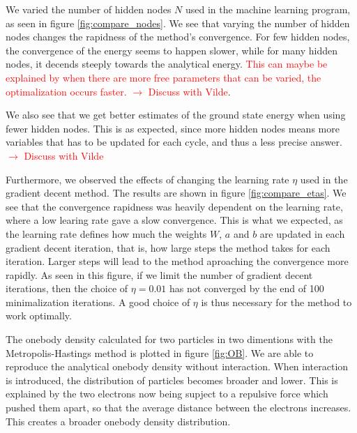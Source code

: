 \documentclass[norsk,a4paper,12pt]{article}
\begin{document}
\par 
\vspace{3mm}
We varied the number of hidden nodes $N$ used in the machine learning program, as seen in figure \ref{fig:compare_nodes}. We see that varying the number of hidden nodes changes the rapidness of the method's convergence. For few hidden nodes, the convergence of the energy seems to happen slower, while for many hidden nodes, it decends steeply towards the analytical energy. \textcolor{red}{This can maybe be explained by when there are more free parameters that can be varied, the optimalization occurs faster. $\rightarrow$ Discuss with Vilde}. \par 
We also see that we get better estimates of the ground state energy when using fewer hidden nodes. This is as expected, since more hidden nodes means more variables that has to be updated for each cycle, and thus a less precise answer. \textcolor{red}{$\rightarrow$ Discuss with Vilde}
\par 
\vspace{3mm}

Furthermore, we observed the effects of changing the learning rate $\eta$ used in the gradient decent method. The results are shown in figure \ref{fig:compare_etas}. We see that the convergence rapidness was heavily dependent on the learning rate, where a low learing rate gave a slow convergence. This is what we expected, as the learning rate defines how much the weights $W$, $a$ and $b$ are updated in each gradient decent iteration, that is, how large steps the method takes for each iteration. Larger steps will lead to the method aproaching the convergence more rapidly. As seen in this figure, if we limit the number of gradient decent iterations, then the choice of $\eta=0.01$ has not converged by the end of 100 minimalization iterations. A good choice of $\eta$ is thus necessary for the method to work optimally.
\par  
\vspace{3mm}

The onebody density calculated for two particles in two dimentions with the Metropolis-Hastings method is plotted in figure \ref{fig:OB}. We are able to reproduce the analytical onebody density without interaction. When interaction is introduced, the distribution of particles becomes broader and lower. This is explained by the two electrons now being supject to a repulsive force which pushed them apart, so that the average distance between the electrons increases. This creates a broader onebody density distribution.
\par 
\vspace{3mm}
\end{document}
